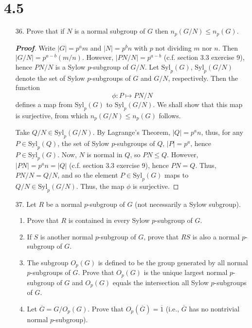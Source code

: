 \documentclass[12pt,leqno]{book}
\theoremstyle{definition}
\newenvironment{Proof}{\begin{proof}[\textnormal{\textbf{Proof}}]}{\end{proof}}
\begin{document}
\section*{4.5}
\begin{enumerate}
 \item [36.] Prove that if $N$ is a normal subgroup of $G$ then $n_p(G/N)\leq n_p(G)$. 

\begin{Proof}
 Write $|G|=p^am$ and $|N|=p^bn$ with $p$ not dividing $m$ nor $n$. Then $|G/N|=p^{a-b}(m/n)$. However, $|PN/N|=p^{a-b}$ (c.f. section 3.3 exercise 9), hence $PN/N$ is a Sylow $p$-subgroup of $G/N$. Let $\text{Syl}_p(G)$, $\text{Syl}_p(G/N)$ denote the set of Sylow $p$-subgroups of $G$ and $G/N$, respectively. Then the function \[\phi:P\mapsto PN/N\] defines a map from $\text{Syl}_p(G)$ to $\text{Syl}_p(G/N)$. We shall show that this map is surjective, from which $n_p(G/N)\leq n_p(G)$ follows.

Take $Q/N\in\text{Syl}_p(G/N)$. By Lagrange's Theorem, $|Q|=p^an$, thus, for any $P\in\text{Syl}_p(Q)$, the set of Sylow $p$-subgroups of $Q$, $|P|=p^a$, hence $P\in\text{Syl}_p(G)$. Now, $N$ is normal in $Q$, so $PN\leq Q$. However, $|PN|=p^an=|Q|$ (c.f. section 3.3 exercise 9), hence $PN=Q$. Thus, $PN/N=Q/N$, and so the element $P\in\text{Syl}_p(G)$ maps to $Q/N\in\text{Syl}_p(G/N)$. Thus, the map $\phi$ is surjective.
\end{Proof}

 \item [37.] Let $R$ be a normal $p$-subgroup of $G$ (not necessarily a Sylow subgroup).
  \begin{enumerate}
   \item Prove that $R$ is contained in every Sylow $p$-subgroup of $G$.
   \item If $S$ is another normal $p$-subgroup of $G$, prove that $RS$ is also a normal $p$-subgroup of $G$.
   \item The subgroup $O_p(G)$ is defined to be the group generated by all normal $p$-subgroups of $G$. Prove that $O_p(G)$ is the unique largest normal $p$-subgroup of $G$ and $O_p(G)$ equals the intersection all Sylow $p$-subgroups of $G$. 
   \item Let $\overline{G}=G/O_p(G)$. Prove that $O_p(\overline{G})=\overline{1}$ (i.e., $\overline{G}$ has no nontrivial normal $p$-subgroup).
  \end{enumerate}


\end{enumerate}
\end{document}
